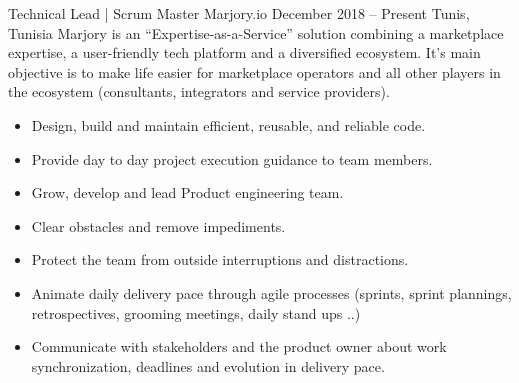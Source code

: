 \documentclass[10pt,a4paper]{resume-settings}
\begin{document}

\begin{fullwidth}
\makecvheader
\end{fullwidth}



\cvevent
    {Technical Lead | Scrum Master}
    {Marjory.io}
    {December 2018 -- Present}
    {Tunis, Tunisia}
    {Marjory is an “Expertise-as-a-Service” solution combining a marketplace expertise, a user-friendly tech platform and a diversified ecosystem. It’s main objective is to make life easier for marketplace operators and all other players in the ecosystem (consultants, integrators and service providers).}
    \begin{itemize}
        \item Design, build and maintain efficient, reusable, and reliable code.
        \item Provide day to day project execution guidance to team members.
        \item Grow, develop and lead Product engineering team.
        \item Clear obstacles and remove impediments.
        \item Protect the team from outside interruptions and distractions.
        \item Animate daily delivery pace through agile processes (sprints, sprint plannings, retrospectives, grooming meetings, daily stand ups ..)
        \item Communicate with stakeholders and the product owner about work synchronization, deadlines and evolution in delivery pace.
    \end{itemize}
\divider
\end{document}
